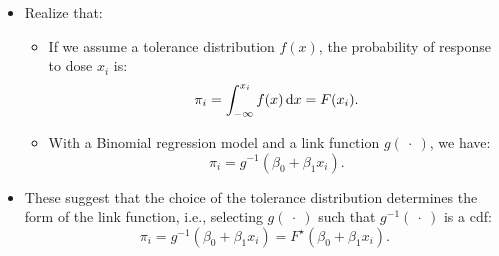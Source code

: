 \documentclass[oneside]{book}\usepackage[]{graphicx}\usepackage[svgnames]{xcolor}
\begin{document}
\begin{itemize}
      \item Realize that:
            \begin{itemize}
                  \item If we assume a tolerance distribution $ f(x) $, the probability of response to dose $ x_i $ is:
                        \[ \pi_i=\int_{-\infty}^{x_i}f(x)\odif{x} =F(x_i). \]
                  \item With a Binomial regression model and a link function $ g(\:\cdot\:) $, we have:
                        \[ \pi_i=g^{-1}(\beta_0+\beta_1x_i). \]
            \end{itemize}
      \item These suggest that the choice of the tolerance distribution determines the form of the link function, i.e., selecting
            $ g(\:\cdot\:) $ such that $ g^{-1}(\:\cdot\:) $ is a cdf:
            \[ \pi_i=g^{-1}(\beta_0+\beta_1x_i)=F^\star(\beta_0+\beta_1x_i). \]
\end{itemize}
\end{document}
